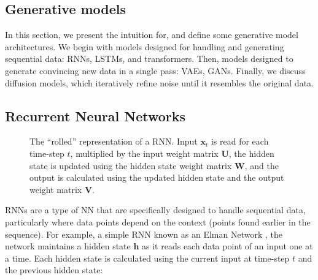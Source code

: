 \documentclass{article}
\begin{document}
\subsection{Generative models}
In this section, we present the intuition for, and define some generative model architectures. We begin with models designed for handling and generating sequential data: RNNs, LSTMs, and transformers. Then, models designed to generate convincing new data in a single pass: VAEs, GANs. Finally, we discuss diffusion models, which iteratively refine noise until it resembles the original data. 

\subsection{Recurrent Neural Networks}
\begin{figure}
\caption{The ``rolled'' representation of a RNN. Input \(\mathbf{x}_t\) is read for each time-step \(t\), multiplied by the input weight matrix \(\mathbf{U}\), the hidden state is updated using the hidden state weight matrix \(\mathbf{W}\), and the output is calculated using the updated hidden state and the output weight matrix \(\mathbf{V}\).}
\end{figure}

RNNs are a type of NN that are specifically designed to handle sequential data, particularly where data points depend on the context (points found earlier in the sequence). For example, a simple RNN known as an Elman Network \citep{elman_finding_1990}, the network maintains a hidden state \(\mathbf{h}\) as it reads each data point of an input one at a time. Each hidden state is calculated using the current input at time-step \(t\) and the previous hidden state:
\end{document}
